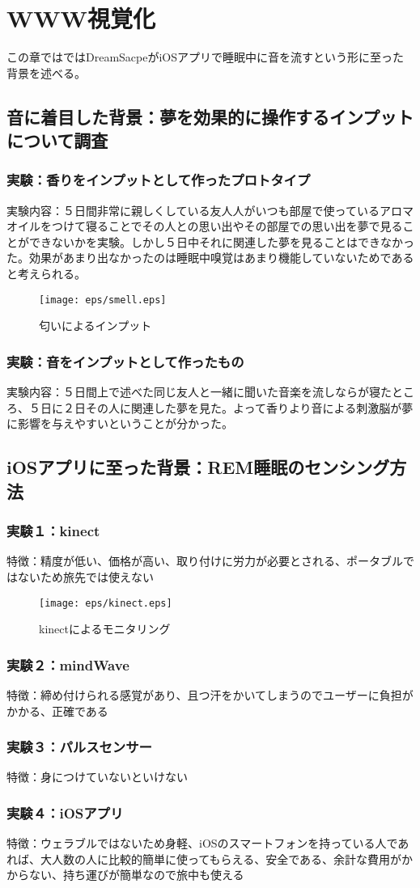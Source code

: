 \chapter{WWW視覚化}
\label{chap:visualize}

この章ではではDreamSacpeがiOSアプリで睡眠中に音を流すという形に至った背景を述べる。

\section{音に着目した背景：夢を効果的に操作するインプットについて調査}
\subsection{実験：香りをインプットとして作ったプロトタイプ}
実験内容：５日間非常に親しくしている友人人がいつも部屋で使っているアロマオイルをつけて寝ることでその人との思い出やその部屋での思い出を夢で見ることができないかを実験。しかし５日中それに関連した夢を見ることはできなかった。効果があまり出なかったのは睡眠中嗅覚はあまり機能していないためであると考えられる。
\begin{figure}[htbp]
\begin{center}
\texttt{[image: eps/smell.eps]}
\caption{匂いによるインプット}
\label{匂いによるインプット}
\end{center}
\end{figure}

\subsection{実験：音をインプットとして作ったもの}
実験内容：５日間上で述べた同じ友人と一緒に聞いた音楽を流しならが寝たところ、５日に２日その人に関連した夢を見た。よって香りより音による刺激脳が夢に影響を与えやすいということが分かった。


\section{iOSアプリに至った背景：REM睡眠のセンシング方法}
\subsection{実験１：kinect}
特徴：精度が低い、価格が高い、取り付けに労力が必要とされる、ポータブルではないため旅先では使えない
\begin{figure}[htbp]
\begin{center}
\texttt{[image: eps/kinect.eps]}
\caption{kinectによるモニタリング}
\label{kinectによるモニタリング}
\end{center}
\end{figure}

\subsection{実験２：mindWave}
特徴：締め付けられる感覚があり、且つ汗をかいてしまうのでユーザーに負担がかかる、正確である
\subsection{実験３：パルスセンサー}
特徴：身につけていないといけない
\subsection{実験４：iOSアプリ}
特徴：ウェラブルではないため身軽、iOSのスマートフォンを持っている人であれば、大人数の人に比較的簡単に使ってもらえる、安全である、余計な費用がかからない、持ち運びが簡単なので旅中も使える
